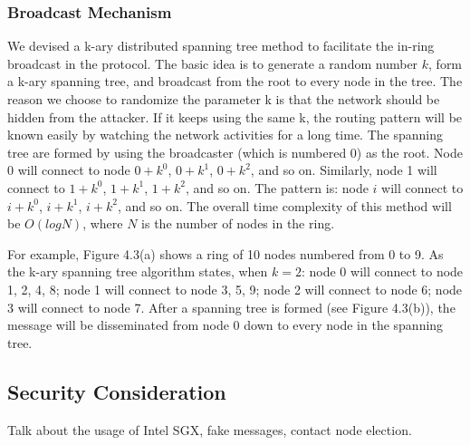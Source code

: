 \subsubsection{Broadcast Mechanism}

We devised a k-ary distributed spanning tree method to facilitate the in-ring broadcast in the protocol. The basic idea is to generate a random number $k$, form a k-ary spanning tree, and broadcast from the root to every node in the tree. The reason we choose to randomize the parameter k is that the network should be hidden from the attacker. If it keeps using the same k, the routing pattern will be known easily by watching the network activities for a long time. The spanning tree are formed by using the broadcaster (which is numbered 0) as the root. Node 0 will connect to node $0+k^0$, $0+k^1$, $0+k^2$, and so on. Similarly, node 1 will connect to $1+k^0$, $1+k^1$, $1+k^2$, and so on. The pattern is: node $i$ will connect to $i+k^0$, $i+k^1$, $i+k^2$, and so on. The overall time complexity of this method will be $O(logN)$, where $N$ is the number of nodes in the ring. 

For example, Figure 4.3(a) shows a ring of 10 nodes numbered from 0 to 9. As the k-ary spanning tree algorithm states, when $k=2$: node 0 will connect to node 1, 2, 4, 8; node 1 will connect to node 3, 5, 9; node 2 will connect to node 6; node 3 will connect to node 7. After a spanning tree is formed (see Figure 4.3(b)), the message will be disseminated from node 0 down to every node in the spanning tree.


\subsection{Security Consideration}

Talk about the usage of Intel SGX, fake messages, contact node election.